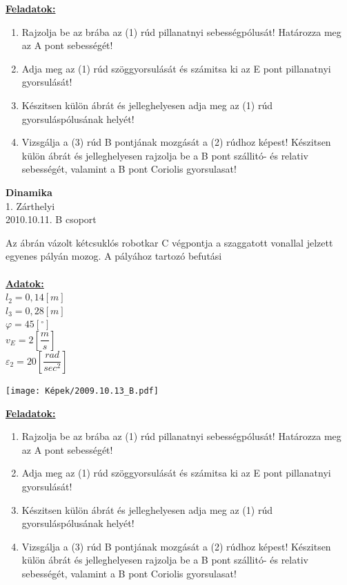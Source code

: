 \documentclass[11pt,a4paper]{article}
\begin{document}
\vspace{2em}
\underline{\textbf{Feladatok:}}
\begin{enumerate}
    \item Rajzolja be az brába az (1) rúd pillanatnyi sebességpólusát! Határozza meg az A pont
    sebességét!
    \item Adja meg az (1) rúd szöggyorsulását és számitsa ki az E pont pillanatnyi gyorsulását!
    \item Készitsen külön ábrát és jelleghelyesen adja meg az (1) rúd gyorsuláspólusának helyét!
    \item Vizsgálja a (3) rúd B pontjának mozgását a (2) rúdhoz képest! Készitsen külön ábrát és
    jelleghelyesen rajzolja be a B pont szállitó- és relativ sebességét, valamint a B pont Coriolis gyorsulasat!
\end{enumerate}
\newpage

\begin{center}
    \textbf{\LARGE{Dinamika}}\\
    1. Zárthelyi\\
    2010.10.11. B csoport
\end{center}
Az ábrán vázolt kétcsuklós robotkar C végpontja a szaggatott vonallal jelzett egyenes pályán mozog. A pályához tartozó befutási \\\\
\underline{\textbf{Adatok:}}\\
$l_2 = 0,14 [m]$\\
$l_3 = 0,28 [m]$\\
$\varphi = 45 [^\circ]$\\
$v_E = 2 \left[\dfrac{m}{s}\right]$\\
$\varepsilon_2 = 20 \left[\dfrac{rad}{sec^2}\right]$
\begin{center}
    \texttt{[image: Képek/2009.10.13\_B.pdf]}
\end{center}

\vspace{2em}
\underline{\textbf{Feladatok:}}
\begin{enumerate}
    \item Rajzolja be az brába az (1) rúd pillanatnyi sebességpólusát! Határozza meg az A pont
    sebességét!
    \item Adja meg az (1) rúd szöggyorsulását és számitsa ki az E pont pillanatnyi gyorsulását!
    \item Készitsen külön ábrát és jelleghelyesen adja meg az (1) rúd gyorsuláspólusának helyét!
    \item Vizsgálja a (3) rúd B pontjának mozgását a (2) rúdhoz képest! Készitsen külön ábrát és
    jelleghelyesen rajzolja be a B pont szállitó- és relativ sebességét, valamint a B pont Coriolis gyorsulasat!
\end{enumerate}
\end{document}
